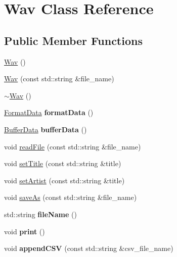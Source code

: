 \hypertarget{classWav}{}\section{Wav Class Reference}
\label{classWav}
\subsection*{Public Member Functions}
\begin{DoxyCompactItemize}
\item 
\hyperlink{classWav_abe9848ac7af353c82a78f00a600c18e6}{Wav} ()
\item 
\hyperlink{classWav_abaf926eed5e8b8cb1952956ca51b8c77}{Wav} (const std\+::string \&file\+\_\+name)
\item 
\hyperlink{classWav_a1510b246ba121b103a60b8e7839af25f}{$\sim$\+Wav} ()
\item 
\mbox{\label{classWav_a3eaef5a2ba1923a5da9b772e7dd8fc5d}} 
\hyperlink{structFormatData}{Format\+Data} {\bfseries format\+Data} ()
\item 
\mbox{\label{classWav_a52234205f6991cdd7423f1dac337cb09}} 
\hyperlink{structBufferData}{Buffer\+Data} {\bfseries buffer\+Data} ()
\item 
void \hyperlink{classWav_a8920a07a9210ed7de876a2f18768bbce}{read\+File} (const std\+::string \&file\+\_\+name)
\item 
void \hyperlink{classWav_afa78c8a77ee91541fc13bfb9a71f0cfa}{set\+Title} (const std\+::string \&title)
\item 
void \hyperlink{classWav_a5542e8f6a3c8fc54b2acfb31683d52a6}{set\+Artist} (const std\+::string \&title)
\item 
void \hyperlink{classWav_a67710ef5028074bbeccf84b662c89baa}{save\+As} (const std\+::string \&file\+\_\+name)
\item 
\mbox{\label{classWav_a666a944b598ff96cc109ee482f653abb}} 
std\+::string {\bfseries file\+Name} ()
\item 
\mbox{\label{classWav_adfe08ea7b2a3e434fbbafa4c4bc98f9a}} 
void {\bfseries print} ()
\item 
\mbox{\label{classWav_af9af62261031a739ce5c6cbbd989a50e}} 
void {\bfseries append\+C\+SV} (const std\+::string \&csv\+\_\+file\+\_\+name)
\end{DoxyCompactItemize}


